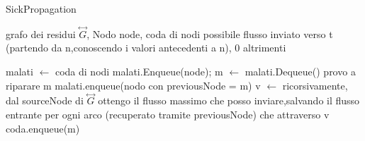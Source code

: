 \documentclass{article}
\begin{document}
\begin{algorithm}
\caption{SickPropagation}
\begin{algorithmic}
\REQUIRE grafo dei residui $\overset{\leftrightarrow}{G}$, Nodo node, coda di nodi
\ENSURE possibile flusso inviato verso t (partendo da n,conoscendo i valori antecedenti a n), 0 altrimenti

\STATE malati $\leftarrow$ coda di nodi
\STATE malati.Enqueue(node);
\STATE m $\leftarrow$ malati.Dequeue()
\STATE provo a riparare m
\STATE malati.enqueue(nodo con previousNode = m)
\STATE v $\leftarrow$ ricorsivamente, dal sourceNode di $\overset{\leftrightarrow}{G}$ ottengo il flusso massimo che posso inviare,salvando il flusso entrante per ogni arco (recuperato tramite previousNode) che attraverso
\RETURN v
\ELSE
\STATE coda.enqueue(m)
\ENDIF
\ENDWHILE
{}



\end{algorithmic}
\end{algorithm}
\end{document}
